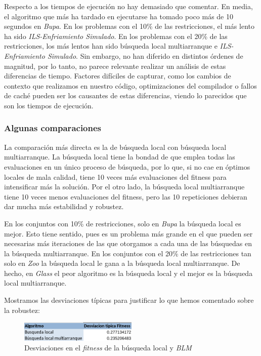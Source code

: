 \documentclass[11pt]{article}
\begin{document}
Respecto a los tiempos de ejecución no hay demasiado que comentar. En media, el algoritmo que más ha tardado en ejecutarse ha tomado poco más de 10 segundos en \emph{Bupa}. En los problemas con el 10\% de las restricciones, el más lento ha sido \emph{ILS-Enfriamiento Simulado}. En los problemas con el 20\% de las restricciones, los más lentos han sido búsqueda local multiarranque e \emph{ILS-Enfriamiento Simulado}. Sin embargo, no han diferido en distintos órdenes de magnitud, por lo tanto, no parece relevante realizar un análisis de estas diferencias de tiempo. Factores difíciles de capturar, como los cambios de contexto que realizamos en nuestro código, optimizaciones del compilador o fallos de caché pueden ser los causantes de estas diferencias, viendo lo parecidos que son los tiempos de ejecución.

\subsubsection{Algunas comparaciones}

La comparación más directa es la de búsqueda local con búsqueda local multiarranque. La búsqueda local tiene la bondad de que emplea todas las evaluaciones en un único proceso de búsqueda, por lo que, si no cae en óptimos locales de mala calidad, tiene 10 veces más evaluaciones del fitness para intensificar más la solución. Por el otro lado, la búsqueda local multiarranque tiene 10 veces menos evaluaciones del fitness, pero las 10 repeticiones debieran dar mucha más estabilidad y robustez.

En los conjuntos con 10\% de restricciones, solo en \emph{Bupa} la búsqueda local es mejor. Esto tiene sentido, pues es un problema más grande en el que pueden ser necesarias más iteraciones de las que otorgamos a cada una de las búsquedas en la búsqueda multiarranque. En los conjuntos con el 20\% de las restricciones tan solo en \emph{Zoo} la búsqueda local le gana a la búsqueda local multiarranque. De hecho, en \emph{Glass} el peor algoritmo es la búsqueda local y el mejor es la búsqueda local multiarranque.

Mostramos las desviaciones típicas para justificar lo que hemos comentado sobre la robustez:

\begin{figure}[H]
    \centering
    \includegraphics[width=0.5\textwidth]{desviaciones}
    \caption{Desviaciones en el \emph{fitness} de la búsqueda local y \emph{BLM}}
\end{figure}
\end{document}
